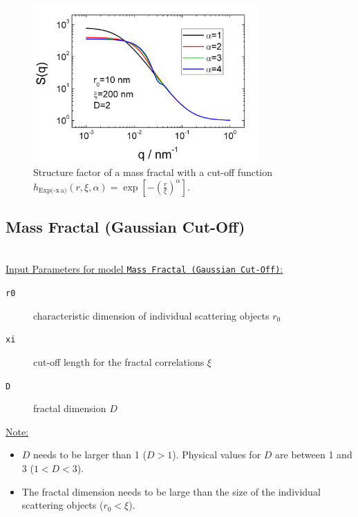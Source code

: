\begin{figure}[htb]
\begin{center}
\includegraphics[width=0.768\textwidth]{../images/structure_factor/MassFractals/SQExp(pow(x,a))CutOff.png}
\end{center}
\caption{Structure factor of a mass fractal with a cut-off function
$h_\text{Exp(-x$\hat{~}$a)}(r,\xi,\alpha) = \exp\left[-\left(\tfrac{r}{\xi}\right)^\alpha\right]$.}
\label{fig:SQExpxaCutOff}
\end{figure}


\clearpage
\subsection{Mass Fractal (Gaussian Cut-Off)}
~\\

\underline{Input Parameters for model \texttt{Mass Fractal (Gaussian Cut-Off)}:}
\begin{description}
\item[\texttt{r0}] characteristic dimension of individual scattering objects $r_0$
\item[\texttt{xi}] cut-off length for the fractal correlations $\xi$
\item[\texttt{D}] fractal dimension $D$
\end{description}

\underline{Note:}
\begin{itemize}
\item $D$ needs to be larger than 1 ($D>1$). Physical values for $D$ are between 1 and 3 ($1<D<3$).
\item The fractal dimension needs to be large than the size of the individual scattering objects ($r_0 < \xi$).
\end{itemize}


